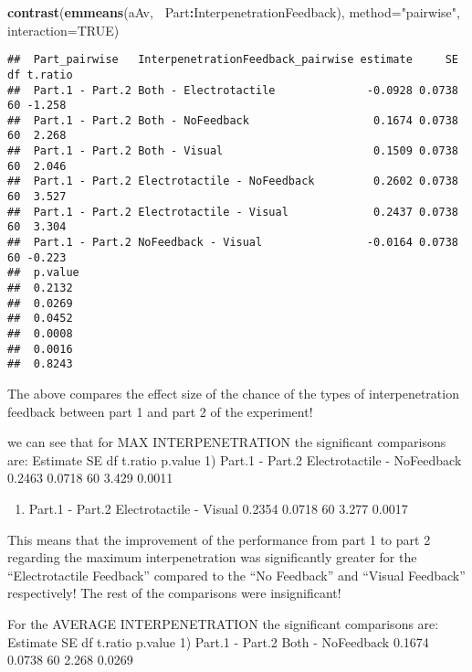 \documentclass[
]{article}
\newenvironment{Shaded}{\begin{snugshade}}{\end{snugshade}}
\newcommand{\DataTypeTok}[1]{\textcolor[rgb]{0.13,0.29,0.53}{#1}}
\newcommand{\KeywordTok}[1]{\textcolor[rgb]{0.13,0.29,0.53}{\textbf{#1}}}
\newcommand{\NormalTok}[1]{#1}
\newcommand{\OperatorTok}[1]{\textcolor[rgb]{0.81,0.36,0.00}{\textbf{#1}}}
\newcommand{\OtherTok}[1]{\textcolor[rgb]{0.56,0.35,0.01}{#1}}
\newcommand{\StringTok}[1]{\textcolor[rgb]{0.31,0.60,0.02}{#1}}
\providecommand{\tightlist}{%
  \setlength{\itemsep}{0pt}\setlength{\parskip}{0pt}}
\begin{document}
\begin{Shaded}
\begin{Highlighting}[]
\KeywordTok{contrast}\NormalTok{(}\KeywordTok{emmeans}\NormalTok{(aAv,}\OperatorTok{~}\StringTok{ }\NormalTok{Part}\OperatorTok{:}\NormalTok{InterpenetrationFeedback), }
         \DataTypeTok{method=}\StringTok{"pairwise"}\NormalTok{, }\DataTypeTok{interaction=}\OtherTok{TRUE}\NormalTok{)}
\end{Highlighting}
\end{Shaded}

\begin{verbatim}
##  Part_pairwise   InterpenetrationFeedback_pairwise estimate     SE df t.ratio
##  Part.1 - Part.2 Both - Electrotactile              -0.0928 0.0738 60 -1.258 
##  Part.1 - Part.2 Both - NoFeedback                   0.1674 0.0738 60  2.268 
##  Part.1 - Part.2 Both - Visual                       0.1509 0.0738 60  2.046 
##  Part.1 - Part.2 Electrotactile - NoFeedback         0.2602 0.0738 60  3.527 
##  Part.1 - Part.2 Electrotactile - Visual             0.2437 0.0738 60  3.304 
##  Part.1 - Part.2 NoFeedback - Visual                -0.0164 0.0738 60 -0.223 
##  p.value
##  0.2132 
##  0.0269 
##  0.0452 
##  0.0008 
##  0.0016 
##  0.8243
\end{verbatim}

The above compares the effect size of the chance of the types of
interpenetration feedback between part 1 and part 2 of the experiment!

we can see that for MAX INTERPENETRATION the significant comparisons
are: Estimate SE df t.ratio p.value 1) Part.1 - Part.2 Electrotactile -
NoFeedback 0.2463 0.0718 60 3.429 0.0011

\begin{enumerate}
\def\labelenumi{\arabic{enumi})}
\setcounter{enumi}{1}
\tightlist
\item
  Part.1 - Part.2 Electrotactile - Visual 0.2354 0.0718 60 3.277 0.0017
\end{enumerate}

This means that the improvement of the performance from part 1 to part 2
regarding the maximum interpenetration was significantly greater for the
``Electrotactile Feedback'' compared to the ``No Feedback'' and ``Visual
Feedback'' respectively! The rest of the comparisons were insignificant!

For the AVERAGE INTERPENETRATION the significant comparisons are:
Estimate SE df t.ratio p.value 1) Part.1 - Part.2 Both - NoFeedback
0.1674 0.0738 60 2.268 0.0269
\end{document}
